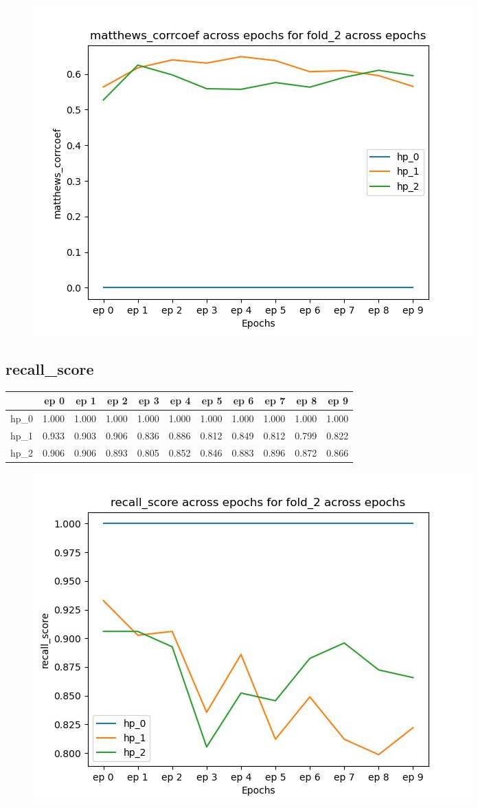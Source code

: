 \documentclass{article}
\begin{document}
\begin{figure}[H]
\includegraphics[scale = 0.75]{fold_2/matthews_corrcoef}
\end{figure}
\subsection{recall\_score}
\begin{tabular}{lrrrrrrrrrr}
\toprule
{} &   ep 0 &   ep 1 &   ep 2 &   ep 3 &   ep 4 &   ep 5 &   ep 6 &   ep 7 &   ep 8 &   ep 9 \\
\midrule
hp\_0 &  1.000 &  1.000 &  1.000 &  1.000 &  1.000 &  1.000 &  1.000 &  1.000 &  1.000 &  1.000 \\
hp\_1 &  0.933 &  0.903 &  0.906 &  0.836 &  0.886 &  0.812 &  0.849 &  0.812 &  0.799 &  0.822 \\
hp\_2 &  0.906 &  0.906 &  0.893 &  0.805 &  0.852 &  0.846 &  0.883 &  0.896 &  0.872 &  0.866 \\
\bottomrule
\end{tabular}

\begin{figure}[H]
\includegraphics[scale = 0.75]{fold_2/recall_score}
\end{figure}
\end{document}
